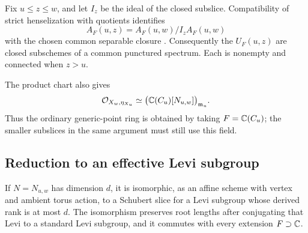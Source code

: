 Fix $u\le z\le w$, and let $I_z$ be the ideal of the closed subslice. Compatibility of strict henselization with quotients identifies
\[
 A_F(u,z)=A_F(u,w)/I_zA_F(u,w)
\]
with the chosen common separable closure \cite[Tag~05WS]{The26}. Consequently the $U_F(u,z)$ are closed subschemes of a common punctured spectrum. Each is nonempty and connected when $z>u$.

The product chart also gives
\[
 \mathcal O_{X_w,\eta_{X_u}}
 \simeq\bigl(\mathbb C(C_u)[N_{u,w}]\bigr)_{\mathfrak m_u}.
\]
Thus the ordinary generic-point ring is obtained by taking $F=\mathbb C(C_u)$; the smaller subslices in the same argument must still use this field.

\subsection{Reduction to an effective Levi subgroup}
\begin{proposition}\label{tor:levi}
If $N=N_{u,w}$ has dimension $d$, it is isomorphic, as an affine scheme with vertex and ambient torus action, to a Schubert slice for a Levi subgroup whose derived rank is at most $d$. The isomorphism preserves root lengths after conjugating that Levi to a standard Levi subgroup, and it commutes with every extension $F\supset\mathbb C$.
\end{proposition}
